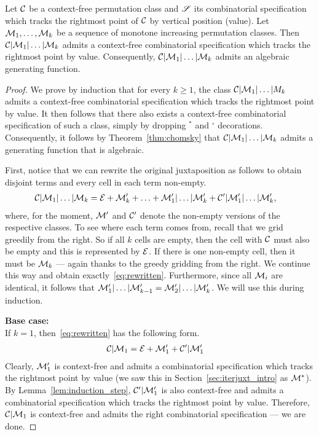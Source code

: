 \documentclass[12pt, a4paper, twoside]{report}
\begin{document}
\begin{proposition}
  \label{prop:onesidedjuxt}
  Let $\mathcal{C}$ be a context-free permutation class and $\mathscr{S}$ its combinatorial specification which tracks the rightmost point of $\mathcal{C}$ by vertical position (value). Let $\mathcal{M}_1,\ldots,\mathcal{M}_k$ be a sequence of monotone increasing permutation classes. Then $\mathcal{C}|\mathcal{M}_1|\ldots|\mathcal{M}_k$ admits a context-free combinatorial specification which tracks the rightmost point by value. Consequently, $\mathcal{C}|\mathcal{M}_1|\ldots|\mathcal{M}_k$ admits an algebraic generating function.
\end{proposition}
\begin{proof}
  We prove by induction that for every $k \geq 1$, the class $\mathcal{C}|\mathcal{M}_1|\ldots|M_k$ admits a context-free combinatorial specification which tracks the rightmost point by value. It then follows that there also exists a context-free combinatorial specification of such a class, simply by dropping ${}^*$ and ${}^\circ$ decorations. Consequently, it follows by Theorem~\ref{thm:chomsky} that $\mathcal{C}|\mathcal{M}_1|\ldots|\mathcal{M}_k$ admits a generating function that is algebraic.

  First, notice that we can rewrite the original juxtaposition as follows to obtain disjoint terms and every cell in each term non-empty.
\begin{align}
  \mathcal{C}|\mathcal{M}_1|\ldots|\mathcal{M}_k &= \mathcal{E} + \mathcal{M}'_k + \ldots + \mathcal{M}'_1|\ldots|\mathcal{M}'_k  + \mathcal{C}'|\mathcal{M}'_1|\ldots|\mathcal{M}'_k,
\label{eq:rewritten}
\end{align}
 where, for the moment, $\mathcal{M}'$ and $\mathcal{C}'$ denote the non-empty versions of the respective classes. To see where each term comes from, recall that we grid greedily from the right. So if all $k$ cells are empty, then the cell with $\mathcal{C}$ must also be empty and this is represented by $\mathcal{E}$. If there is one non-empty cell, then it must be $\mathcal{M}_k$ --- again thanks to the greedy gridding from the right. We continue this way and obtain exactly~\eqref{eq:rewritten}. Furthermore, since all $\mathcal{M}_i$ are identical, it follows that $\mathcal{M}_1'|\ldots|\mathcal{M}_{k-1}' = \mathcal{M}_2'|\ldots|\mathcal{M}_{k}'$. We will use this during induction.

\noindent \textbf{Base case:}\\
\noindent If $k = 1$, then~\eqref{eq:rewritten} has the following form.
\begin{align}
  \mathcal{C}|\mathcal{M}_1 &= \mathcal{E} + \mathcal{M}'_1 + \mathcal{C}'|\mathcal{M}'_1
  \label{eq:basecase}
\end{align}
Clearly, $\mathcal{M}_1'$ is context-free and admits a combinatorial specification which tracks the rightmost point by value (we saw this in Section~\ref{sec:iterjuxt_intro} as $\mathcal{M}^*$). By Lemma~\ref{lem:induction_step}, $\mathcal{C}'|\mathcal{M}_1'$ is also context-free and admits a combinatorial specification which tracks the rightmost point by value. Therefore, $\mathcal{C}|\mathcal{M}_1$ is context-free and admits the right combinatorial specification --- we are done.


\end{proof}
\end{document}
